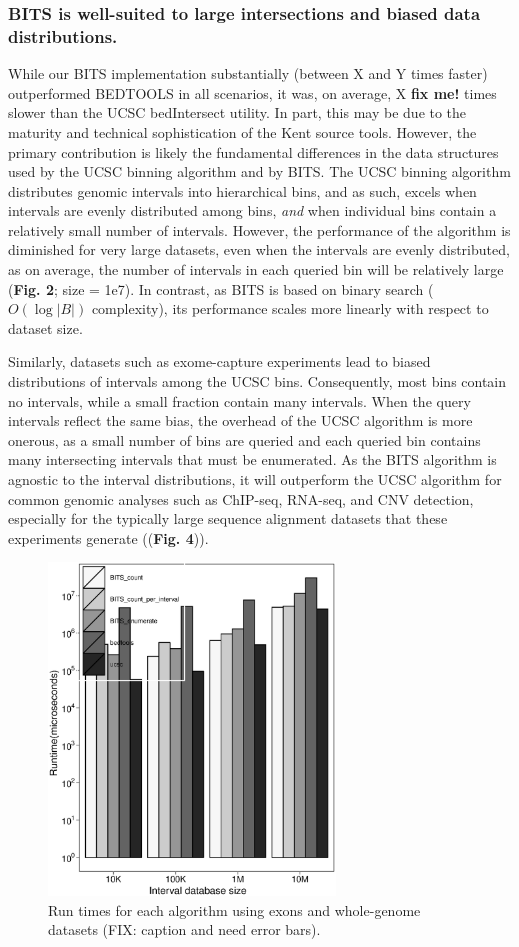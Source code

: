 \documentclass{bioinfo}
\begin{document}
	\subsubsection{BITS is well-suited to large intersections and biased data distributions.}
	While our BITS implementation substantially (between X and Y times faster) outperformed BEDTOOLS 
	in all scenarios, it was, on average, X \textbf{fix me!} times slower than the UCSC bedIntersect utility. 
	In part, this may be due to the maturity and technical sophistication of the Kent source tools. However, the
	primary contribution is likely the fundamental differences in the data structures used by
	the UCSC binning algorithm and by BITS.  The UCSC binning algorithm distributes genomic intervals
	into hierarchical bins, and as such, excels when intervals are evenly distributed among bins, \emph{and}
	when individual bins contain a relatively small number of intervals.  However, the performance of the algorithm
	is diminished for very large datasets, even when the intervals are evenly distributed, as on average, the number
	of intervals in each queried bin will be relatively large (\textbf{Fig. 2}; size = 1e7). In contrast, as BITS is based on
	binary search ($O(\log |B|)$ complexity), its performance scales more linearly with respect to dataset size.

	
	Similarly, datasets such as exome-capture experiments lead to biased distributions of intervals among the UCSC bins.
	Consequently, most bins contain no intervals, while a small fraction contain many intervals. When the query intervals
	reflect the same bias, the overhead of the UCSC algorithm is more onerous, as a small number of bins are queried 
	and each queried bin contains many intersecting intervals that must be enumerated. As the BITS algorithm
	is agnostic to the interval distributions, it will outperform the UCSC algorithm for common genomic analyses such
	as ChIP-seq, RNA-seq, and CNV detection, especially for the typically large sequence alignment datasets
	that these experiments generate ((\textbf{Fig. 4})).
	
	\begin{figure}[h]
		\centering
		\includegraphics[width=3in]{figures/exons-v-genome.eps}
		\caption[]{Run times for each algorithm using exons and whole-genome datasets (FIX: caption and need error bars).}
	\end{figure}
	
\end{document}
